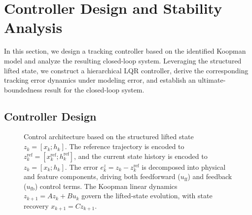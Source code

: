 \documentclass[journal]{IEEEtran}
\begin{document}
\section{Controller Design and Stability Analysis}
\label{sec:control}

In this section, we design a tracking controller based on the identified Koopman model and analyze the resulting closed-loop system. Leveraging the structured lifted state, we construct a hierarchical LQR controller, derive the corresponding tracking error dynamics under modeling error, and establish an ultimate-boundedness result for the closed-loop system.

\subsection{Controller Design}
\label{subsec:controller_design}

\begin{figure}[!t]
    \centering
    \caption{Control architecture based on the structured lifted state $z_k=[x_k;h_k]$. The reference trajectory is encoded to $z_k^{\mathrm{ref}}=[x_k^{\mathrm{ref}};h_k^{\mathrm{ref}}]$, and the current state history is encoded to $z_k=[x_k;h_k]$. The error $e_k^z = z_k - z_k^{\mathrm{ref}}$ is decomposed into physical and feature components, driving both feedforward ($u_{\mathrm{ff}}$) and feedback ($u_{\mathrm{fb}}$) control terms. The Koopman linear dynamics $z_{k+1}=Az_k+Bu_k$ govern the lifted-state evolution, with state recovery $x_{k+1}=Cz_{k+1}$.}
    \label{fig:control_architecture}
\end{figure}
\end{document}

